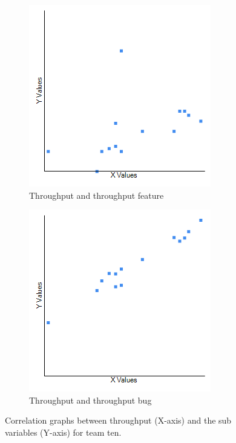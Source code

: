 \documentclass[UKenglish]{ifimaster}  %
\begin{document}
\begin{figure}[h] 
  \begin{subfigure}[b]{0.5\textwidth}
  \center
\includegraphics[scale=0.6]{Picture/Ten/TPvsTPFT.png}
 \caption{Throughput and throughput feature} 
 \label{fig:a:WIP:10}
  \end{subfigure}
  \begin{subfigure}[b]{0.5\textwidth}
  \center
\includegraphics[scale=0.6]{Picture/Ten/TPvsTPB.png}
 \caption{Throughput and throughput bug} 
\label{fig:b:WIP:10}
  \end{subfigure}
  \caption{Correlation graphs between throughput (X-axis) and the sub variables (Y-axis) for team ten.}
\label{corr:Difference:10}
\end{figure}
\end{document}
